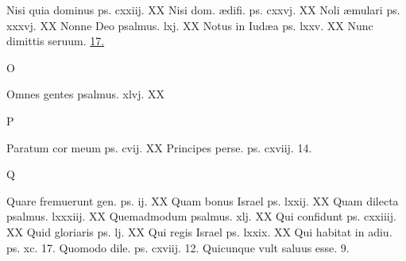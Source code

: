 \documentclass[a5paper,10pt]{book}
\def\ae{æ}
\begin{document}
\begin{multicols}{2}
\par \noindent Nisi quia dominus ps. cxxiij. \hfill XX
\newline Nisi dom. \ae difi. ps. cxxvj. \hfill XX
\newline Noli \ae mulari ps. xxxvj. \hfill XX
\newline Nonne Deo psalmus. lxj. \hfill XX
\newline Notus in Iud\ae a ps. lxxv. \hfill XX
\newline Nunc dimittis seruum. \hfill \hyperlink{Nunc}{17.}
\newline \vspace{-1.75em}
\begin{center}
\color{red} O
\end{center}
\vspace{-.75em}
\par \noindent Omnes gentes psalmus. xlvj. \hfill XX
\newline \vspace{-1.75em}
\begin{center}
\color{red} P
\end{center}
\vspace{-.75em}
\par \noindent Paratum cor meum ps. cvij. \hfill XX
\newline Principes perse. ps. cxviij. \hfill 14.
\newline \vspace{-1.75em}
\begin{center}
\color{red} Q
\end{center}
\vspace{-.75em}
\par \noindent Quare fremuerunt gen. ps. ij. \hfill XX
\newline Quam bonus Israel ps. lxxij. \hfill XX
\newline Quam dilecta psalmus. lxxxiij. \hfill XX
\newline Quemadmodum psalmus. xlj. \hfill XX
\newline Qui confidunt ps. cxxiiij. \hfill XX
\newline Quid gloriaris ps. lj. \hfill XX
\newline Qui regis Israel ps. lxxix. \hfill XX
\newline Qui habitat in adiu. ps. xc. \hfill 17.
\newline Quomodo dile. ps. cxviij. \hfill 12.
\newline Quicunque vult saluus esse. \hfill 9.
\newline \vspace{-1.75em}

\end{multicols}
\end{document}
